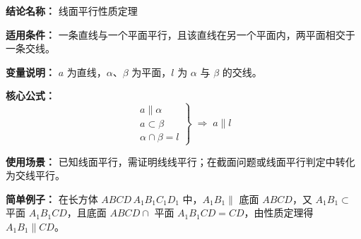 \textbf{结论名称：} 线面平行性质定理

\textbf{适用条件：} 一条直线与一个平面平行，且该直线在另一个平面内，两平面相交于一条交线。

\textbf{变量说明：} $a$ 为直线，$\alpha$、$\beta$ 为平面，$l$ 为 $\alpha$ 与 $\beta$ 的交线。

\textbf{核心公式：}
\[
\boxed{\left.\begin{array}{c}
a \parallel \alpha \\[2pt]
a \subset \beta \\[2pt]
\alpha \cap \beta = l
\end{array}\right\} \;\Rightarrow\; a \parallel l}
\]

\textbf{使用场景：} 已知线面平行，需证明线线平行；在截面问题或线面平行判定中转化为交线平行。

\textbf{简单例子：} 在长方体 $ABCD\,A_1B_1C_1D_1$ 中，$A_1B_1 \parallel$ 底面 $ABCD$，又 $A_1B_1 \subset$ 平面 $A_1B_1CD$，且底面 $ABCD \cap$ 平面 $A_1B_1CD = CD$，由性质定理得 $A_1B_1 \parallel CD$。